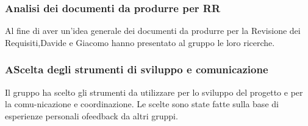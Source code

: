 \subsubsection{Analisi dei documenti da produrre per RR}
Al fine di aver un’idea generale dei documenti da produrre per la Revisione dei Requisiti,Davide e Giacomo hanno presentato al gruppo le loro ricerche.
\subsubsection{AScelta degli strumenti di sviluppo e comunicazione}
Il gruppo ha scelto gli strumenti da utilizzare per lo sviluppo del progetto e per la comu-nicazione e coordinazione. Le scelte sono state fatte sulla base di esperienze personali ofeedback da altri gruppi.